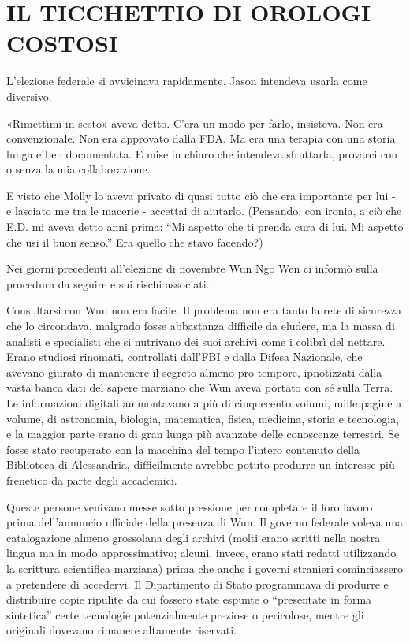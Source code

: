 \chapter{IL TICCHETTIO DI OROLOGI COSTOSI}\label{il-ticchettio-di-orologi-costosi}

\hfill\break

L'elezione federale si avvicinava rapidamente. Jason intendeva usarla
come diversivo.

«Rimettimi in sesto» aveva detto. C'era un modo per farlo, insisteva.
Non era convenzionale. Non era approvato dalla FDA. Ma era una terapia
con una storia lunga e ben documentata. E mise in chiaro che intendeva
sfruttarla, provarci con o senza la mia collaborazione.

E visto che Molly lo aveva privato di quasi tutto ciò che era importante
per lui - e lasciato me tra le macerie - accettai di aiutarlo.
(Pensando, con ironia, a ciò che E.D. mi aveva detto anni prima: ``Mi
aspetto che ti prenda cura di lui. Mi aspetto che usi il buon senso.''
Era quello che stavo facendo?)

Nei giorni precedenti all'elezione di novembre Wun Ngo Wen ci informò
sulla procedura da seguire e sui rischi associati.

Consultarsi con Wun non era facile. Il problema non era tanto la rete di
sicurezza che lo circondava, malgrado fosse abbastanza difficile da
eludere, ma la massa di analisti e specialisti che si nutrivano dei suoi
archivi come i colibrì del nettare. Erano studiosi rinomati, controllati
dall'FBI e dalla Difesa Nazionale, che avevano giurato di mantenere il
segreto almeno pro tempore, ipnotizzati dalla vasta banca dati del
sapere marziano che Wun aveva portato con sé sulla Terra. Le
informazioni digitali ammontavano a più di cinquecento volumi, mille
pagine a volume, di astronomia, biologia, matematica, fisica, medicina,
storia e tecnologia, e la maggior parte erano di gran lunga più avanzate
delle conoscenze terrestri. Se fosse stato recuperato con la macchina
del tempo l'intero contenuto della Biblioteca di Alessandria,
difficilmente avrebbe potuto produrre un interesse più frenetico da
parte degli accademici.

Queste persone venivano messe sotto pressione per completare il loro
lavoro prima dell'annuncio ufficiale della presenza di Wun. Il governo
federale voleva una catalogazione almeno grossolana degli archivi (molti
erano scritti nella nostra lingua ma in modo approssimativo; alcuni,
invece, erano stati redatti utilizzando la scrittura scientifica
marziana) prima che anche i governi stranieri cominciassero a pretendere
di accedervi. Il Dipartimento di Stato programmava di produrre e
distribuire copie ripulite da cui fossero state espunte o ``presentate
in forma sintetica'' certe tecnologie potenzialmente preziose o
pericolose, mentre gli originali dovevano rimanere altamente riservati.

